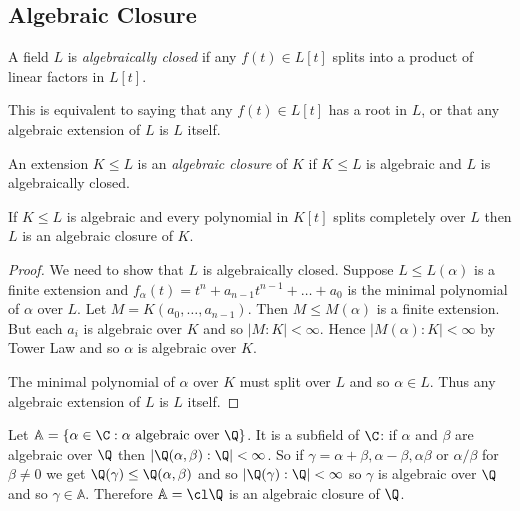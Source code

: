\documentclass[a4paper]{article}
\begin{document}
\subsection{Algebraic Closure}

\begin{definition}
  A field \(L\) is \emph{algebraically closed} if any \(f(t) \in L[t]\) splits into a product of linear factors in \(L[t]\).
\end{definition}

\begin{remark}
  This is equivalent to saying that any \(f(t) \in L[t]\) has a root in \(L\), or that any algebraic extension of \(L\) is \(L\) itself.
\end{remark}

\begin{definition}
  An extension \(K \leq L\) is an \emph{algebraic closure} of \(K\) if \(K \leq L\) is algebraic and \(L\) is algebraically closed.
\end{definition}

\begin{lemma}
  \label{lem:characterisation of algebraic closure}
  If \(K \leq L\) is algebraic and every polynomial in \(K[t]\) splits completely over \(L\) then \(L\) is an algebraic closure of \(K\).
\end{lemma}

\begin{proof}
  We need to show that \(L\) is algebraically closed. Suppose \(L \leq L(\alpha)\) is a finite extension and \(f_\alpha(t) = t^n + a_{n - 1}t^{n - 1} + \dots + a_0\) is the minimal polynomial of \(\alpha\) over \(L\). Let \(M = K(a_0, \dots, a_{n - 1})\). Then \(M \leq M(\alpha)\) is a finite extension. But each \(a_i\) is algebraic over \(K\) and so \(|M:K| < \infty\). Hence \(|M(\alpha):K| < \infty\) by Tower Law and so \(\alpha\) is algebraic over \(K\).

  The minimal polynomial of \(\alpha\) over \(K\) must split over \(L\) and so \(\alpha \in L\). Thus any algebraic extension of \(L\) is \(L\) itself.
\end{proof}

\begin{eg}
  Let \(\mathbb A = \{\alpha \in \C: \alpha \text{ algebraic over } \Q\}\). It is a subfield of \(\C\): if \(\alpha\) and \(\beta\) are algebraic over \(\Q\) then \(|\Q(\alpha, \beta): \Q| < \infty\). So if \(\gamma = \alpha + \beta, \alpha - \beta, \alpha\beta\) or \(\alpha/\beta\) for \(\beta \neq 0\) we get \(\Q(\gamma) \leq \Q(\alpha, \beta)\) and so \(|\Q(\gamma):\Q| < \infty\) so \(\gamma\) is algebraic over \(\Q\) and so \(\gamma \in \mathbb A\). Therefore \(\mathbb A = \cl \Q\) is an algebraic closure of \(\Q\).
\end{eg}
\end{document}
